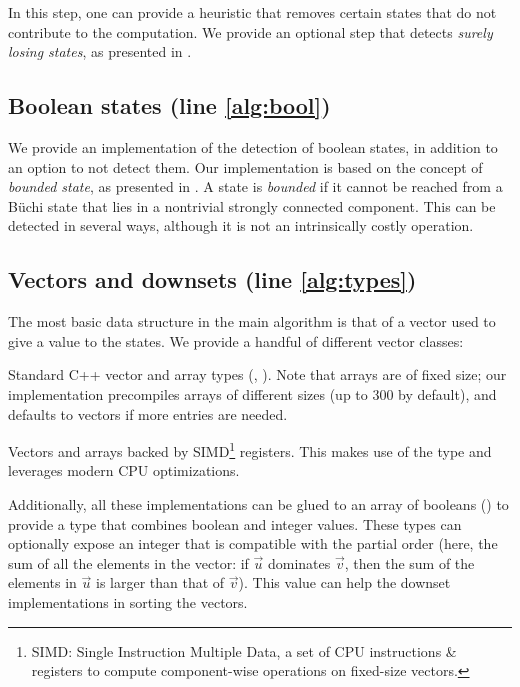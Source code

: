 \documentclass[runningheads,a4paper]{llncs}
\begin{document}
In this step, one can provide a heuristic that removes certain states that
do not contribute to the computation.  We provide an optional step that
detects \emph{surely losing states}, as presented in \cite{ggs14}.

\subsection{Boolean states (line \ref{alg:bool})}\label{sec:implem-bool}

We provide an implementation of the detection of boolean states, in addition to
an option to not detect them.  Our implementation is based on the concept of
\emph{bounded state}, as presented in \cite{bohy14}.  A state is \emph{bounded}
if it cannot be reached from a Büchi state that lies in a nontrivial strongly
connected component.  This can be detected in several ways, although it is not
an intrinsically costly operation.

\subsection{Vectors and downsets (line \ref{alg:types})}\label{sec:vecds}

The most basic data structure in the main algorithm is that of a vector used to
give a value to the states.  We provide a handful of different vector
classes:
\begin{compactitem}
\item Standard C++ vector and array types (,\linebreak
  ).  Note that arrays are of fixed size; our implementation
  precompiles arrays of different sizes (up to \(300\) by default),
  and defaults to vectors if more entries are needed.
\item Vectors and arrays backed by SIMD\footnote{SIMD: Single Instruction
  Multiple Data, a set of CPU instructions \& registers to compute
  component-wise operations on fixed-size vectors.} registers.  This makes use of the
  type  and leverages modern CPU
  optimizations.
\end{compactitem}

Additionally, all these implementations can be glued to an array of booleans
() to provide a type that combines boolean and integer
values.  These types can optionally expose an integer that is compatible with
the partial order (here, the sum of all the elements in the vector: if
\(\vec{u}\) dominates \(\vec{v}\), then the sum of the elements in \(\vec{u}\) is
larger than that of \(\vec{v}\)).  This value can help the downset implementations
in sorting the vectors.
\end{document}
